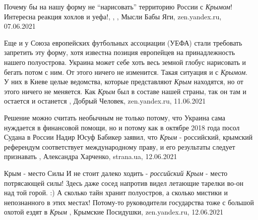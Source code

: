Почему бы на нашу форму не \enquote{нарисовать} территорию России с \emph{Крымом}! Интересна реакция хохлов и уефа!,
,
, Мысли Бабы Яги, zen.yandex.ru, 07.06.2021

Еще и у Союза европейских футбольных ассоциации (УЕФА) стали требовать
запретить эту форму, хотя известна позиция европейцев на принадлежность нашего
полуострова. Украина может себе хоть весь земной глобус нарисовать и бегать
потом с ним. От этого ничего не изменится. Такая ситуация и с \emph{Крымом}. У них в
Киеве целые ведомства, которые представляют \emph{Крым} находятся, но от этого ничего
не меняется. Как \emph{Крым} был в составе нашей страны, так он там и остается и
останется
, 
Добрый Человек, zen.yandex.ru, 11.06.2021

Решение можно считать необычным не только потому, что Украина сама нуждается в
финансовой помощи, но и потому как в октябре 2018 года посол Судана в России
Надир Юсуф Бабикер заявил, что \emph{Крым} - российский, крымский референдум
соответствует международному праву, и его результаты следует признавать
, 
Александра Харченко, strana.ua, 12.06.2021

Крым - место Силы
И не стоит далеко ходить - \emph{российский Крым} - место потрясающей силы! Здесь даже
сосед напротив видел летающие тарелки во-он над той горой. :) А сколько тайн
хранит полуостров, а сколько мистики и непознанного в этих местах! Потому-то
руководители государства тоже с большой охотой ездят в \emph{Крым}
, 
Крымские Посидушки, zen.yandex.ru, 12.06.2021
